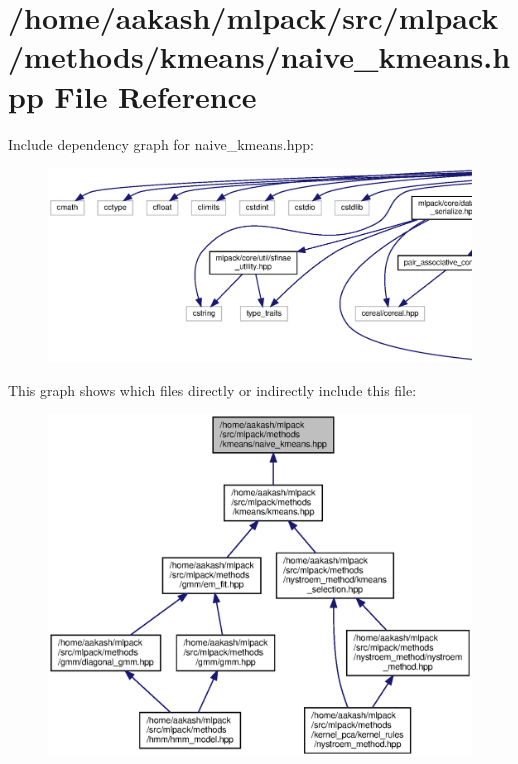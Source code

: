 \section{/home/aakash/mlpack/src/mlpack/methods/kmeans/naive\+\_\+kmeans.hpp File Reference}
\label{naive__kmeans_8hpp}
Include dependency graph for naive\+\_\+kmeans.\+hpp\+:
\nopagebreak
\begin{figure}[H]
\begin{center}
\leavevmode
\includegraphics[width=350pt]{naive__kmeans_8hpp__incl}
\end{center}
\end{figure}
This graph shows which files directly or indirectly include this file\+:
\nopagebreak
\begin{figure}[H]
\begin{center}
\leavevmode
\includegraphics[width=350pt]{naive__kmeans_8hpp__dep__incl}
\end{center}
\end{figure}
